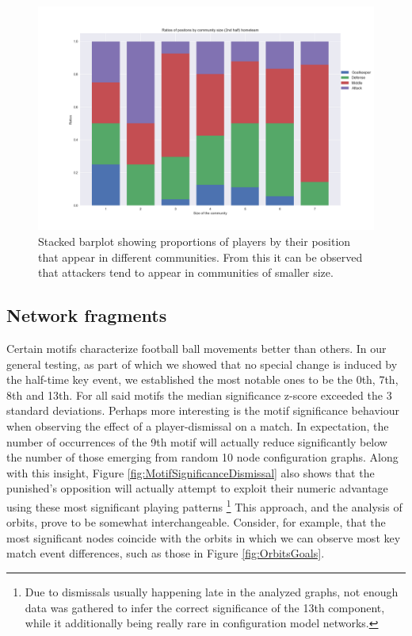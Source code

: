 \documentclass[9pt,twocolumn,twoside]{pnas-report}
\begin{document}
\begin{figure}[t]\centering
	\includegraphics[width=0.8\linewidth]{stack_bar_positions_hht1.png}
	\caption{Stacked barplot showing proportions of players by their position that appear in different communities. From this it can be observed that attackers tend to appear in communities of smaller size. }
	\label{fig:stack_bar_positions_hht1}
\end{figure}








\subsection*{Network fragments}


Certain motifs characterize football ball movements better than others. In our general testing, as part of which we showed that no special change is induced by the half-time key event, we established the most notable ones to be the 0th, 7th, 8th and 13th. For all said motifs the median significance z-score exceeded the 3 standard deviations. Perhaps more interesting is the motif significance behaviour when observing the effect of a player-dismissal on a match. In expectation, the number of occurrences of the 9th motif will actually reduce significantly below the number of those emerging from random 10 node configuration graphs. Along with this insight, Figure \ref{fig:MotifSignificanceDismissal} also shows that the punished's opposition will actually attempt to exploit their numeric advantage using these most significant playing patterns \footnote{Due to dismissals usually happening late in the analyzed graphs, not enough data was gathered to infer the correct significance of the 13th component, while it additionally being really rare in configuration model networks.} This approach, and the analysis of orbits, prove to be somewhat interchangeable. Consider, for example, that the most significant nodes coincide with the orbits in which we can observe most key match event differences, such as those in Figure \ref{fig:OrbitsGoals}.
 
\end{document}
